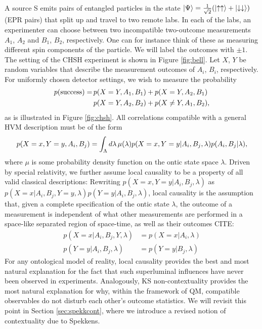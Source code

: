 A source S emits pairs of entangled particles in the state $\left|\Psi\right\rangle =\frac{1}{\sqrt{2}}(\ket{\uparrow\uparrow} +\ket{\downarrow\downarrow})$ (EPR pairs) that split up and travel to two remote labs. In each of the labs, an experimenter can choose between two incompatible two-outcome measurements $A_{1}$, $A_{2}$ and $B_{1}$, $B_{2}$, respectively. One can for instance think of these as measuring different spin components of the particle. We will label the outcomes with $\pm1$. The setting of the CHSH experiment is shown in Figure \ref{fig:bell}. Let $X$, $Y$ be random variables that describe the measurement outcomes of $A_i$, $B_i$, respectively. For uniformly chosen detector settings, we wish to measure the probability
\begin{equation*}
\begin{split}
p(\text{{success}}) =\thinspace & p(X=Y,A_1,B_1)+p(X=Y,A_2,B_1) \\
& p(X=Y,A_2,B_2)+p(X\neq Y,A_1,B_2),
\end{split}
\end{equation*}
as is illustrated in Figure \ref{fig:chsh}.
All correlations compatible with a general HVM description must be of the form
\begin{equation*}
p(X=x,Y=y,A_i,B_j)=\int_{\Lambda}d\lambda\thinspace\mu(\lambda)p(X=x,Y=y\vert A_i,B_j,\lambda)p(A_i,B_j\vert \lambda),
\end{equation*}
where $\mu$ is some probability density function on the ontic state space $\lambda$.
Driven by special relativity, we further assume local causality to be a property of all valid classical descriptions: Rewriting $p(X=x,Y=y \vert A_i,B_j,\lambda)$ as $p(X=x\vert A_i, B_j, Y=y, \lambda)p(Y=y\vert A_i,B_j,\lambda)$, local causality is the assumption that, given a complete specification of the ontic state $\lambda$, the outcome of a measurement is independent of what other measurements are performed in a space-like separated region of space-time, as well as their outcomes CITE:
\begin{align*}
    p(X=x\vert A_i,B_j,Y,\lambda) & =p(X=x\vert A_i,\lambda) \\
    p(Y=y\vert A_i,B_j,\lambda) & =p(Y=y\vert B_j,\lambda)
\end{align*}
For any ontological model of reality, local causality provides the best and most natural explanation for the fact that such superluminal influences have never been observed in experiments. Analogously, KS non-contextuality provides the most natural explanation for why, within the framework of QM, compatible observables do not disturb each other's outcome statistics. We will revisit this point in Section \ref{sec:spekkcont}, where we introduce a revised notion of contextuality due to Spekkens.
